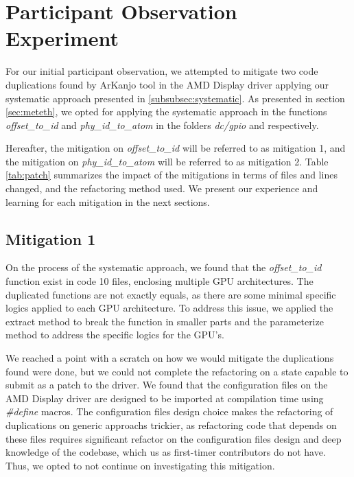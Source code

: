 \en

\section{Participant Observation Experiment}

For our initial participant observation, we attempted to mitigate two code duplications found by ArKanjo tool
in the AMD Display driver applying our systematic approach presented in \ref{subsubsec:systematic}. 
As presented in section \ref{sec:meteth}, we opted for applying the systematic approach in the functions 
\textit{offset\_to\_id} and \textit{phy\_id\_to\_atom} in the folders \textit{dc/gpio} and  respectively.

Hereafter, the mitigation on \textit{offset\_to\_id} will be referred to as mitigation 1, and the mitigation on 
\textit{phy\_id\_to\_atom} will be referred to as mitigation 2. Table \ref{tab:patch} summarizes the impact of the mitigations
in terms of files and lines changed, and the refactoring method used. We present our experience and learning for each mitigation 
in the next sections.



\subsection{Mitigation 1}

On the process of the systematic approach, we found that the \textit{offset\_to\_id} function exist in code 10 files, enclosing
multiple GPU architectures. The duplicated functions are not exactly equals, as there are some minimal specific logics applied
to each GPU architecture. To address this issue, we applied the extract method to break the function in smaller parts and the 
parameterize method to address the specific logics for the GPU's.

We reached a point with a scratch on how we would mitigate the duplications found were done, but we could not complete the refactoring on a state 
capable to submit as a patch to the driver. 
We found that the configuration files on the AMD Display driver are designed to be imported at compilation time
using \textit{\#define} macros. The configuration files design choice makes the refactoring of duplications on generic 
approachs trickier, as refactoring code that depends on these files requires significant refactor on the configuration files
design and deep knowledge of the codebase, which us as first-timer contributors do not have. Thus, we opted to not continue 
on investigating this mitigation.

